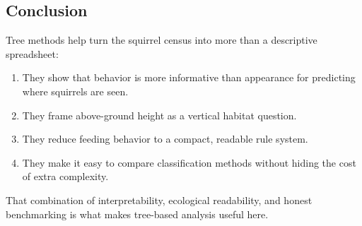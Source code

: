 \documentclass[
  11pt,
]{article}
\providecommand{\tightlist}{%
  \setlength{\itemsep}{0pt}\setlength{\parskip}{0pt}}
\begin{document}
\subsection{Conclusion}\label{conclusion}

Tree methods help turn the squirrel census into more than a descriptive
spreadsheet:

\begin{enumerate}
\def\labelenumi{\arabic{enumi}.}
\tightlist
\item
  They show that behavior is more informative than appearance for
  predicting where squirrels are seen.
\item
  They frame above-ground height as a vertical habitat question.
\item
  They reduce feeding behavior to a compact, readable rule system.
\item
  They make it easy to compare classification methods without hiding the
  cost of extra complexity.
\end{enumerate}

That combination of interpretability, ecological readability, and honest
benchmarking is what makes tree-based analysis useful here.
\end{document}
